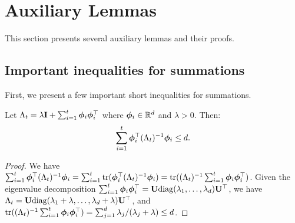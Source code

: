 

\section{Auxiliary Lemmas} \label{sec:aux_lem}

This section presents several auxiliary lemmas and their proofs.

\subsection{Important inequalities for summations}
First, we present a few important short inequalities for summations.

\begin{lemma}\label{lem:basic_ineq} Let $\Lambda_t = \lambda \mathbf{I} + \sum_{i=1}^t \bm{\phi}_i \bm{\phi}_i^{\top}$ where $ \bm{\phi}_i \in \mathbb{R}^d$ and $\lambda > 0$. Then:
\begin{equation*}
\sum_{i=1}^t \bm{\phi}_i^{\top} (\Lambda_t)^{-1} \bm{\phi}_i \le d.
\end{equation*}
\end{lemma}
\begin{proof}
We have $\sum_{i=1}^t \bm{\phi}_i^{\top} (\Lambda_t)^{-1} \bm{\phi}_i
= \sum_{i=1}^t\mathrm{tr}( \bm{\phi}_i^{\top} (\Lambda_t)^{-1} \bm{\phi}_i)
= \mathrm{tr}((\Lambda_t)^{-1} \sum_{i=1}^t\bm{\phi}_i\bm{\phi}_i^{\top})$.
Given the eigenvalue decomposition  $\sum_{i=1}^t\bm{\phi}_i\bm{\phi}_i^{\top} = \mathbf{U} \mathrm{diag}(\lambda_1,  \ldots, \lambda_d)  \mathbf{U}^{\top}$, we have
$\Lambda_t = \mathbf{U} \mathrm{diag}(\lambda_1+\lambda,  \ldots, \lambda_d+\lambda) \mathbf{U}^{\top}$, and $\mathrm{tr}((\Lambda_t)^{-1} \sum_{i=1}^t\bm{\phi}_i\bm{\phi}_i^{\top})=
\sum_{j=1}^d \lambda_j/(\lambda_j + \lambda) \le d$.
\end{proof}


